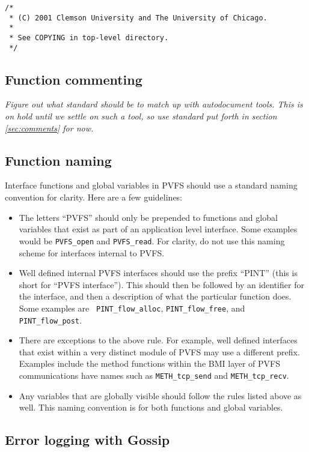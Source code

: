 \documentclass[11pt, letterpaper]{article}
\begin{document}
\begin{verbatim}
/*
 * (C) 2001 Clemson University and The University of Chicago.
 *
 * See COPYING in top-level directory.
 */       
\end{verbatim}

\subsection{Function commenting}
\label{sec:pvfs-comments}

\emph{Figure out what standard should be to match up with autodocument
tools.  This is on hold until we settle on such a tool, so use standard
put forth in section \ref{sec:comments} for now.}

\subsection{Function naming}
\label{sec:pvfs-naming}

Interface functions and global variables in PVFS should use a standard
naming convention for clarity.  Here are a few guidelines:

\begin{itemize}
\item The letters ``PVFS'' should only be prepended to functions and
global variables that exist as part of an application level interface.
Some examples would be {\tt PVFS\_open} and {\tt PVFS\_read}.  For
clarity, do not use this naming scheme for interfaces internal to PVFS.
\item Well defined internal PVFS interfaces should use the prefix
``PINT'' (this is short for ``PVFS interface'').  This should then be
followed by an identifier for the interface, and then a description of
what the particular function does.  Some examples are {\tt
PINT\_flow\_alloc}, {\tt PINT\_flow\_free}, and {\tt PINT\_flow\_post}.
\item There are exceptions to the above rule.  For example, well defined
interfaces that exist within a very distinct module of PVFS may use a
different prefix.  Examples include the method functions within the BMI
layer of PVFS communications have names such as {\tt METH\_tcp\_send}
and {\tt METH\_tcp\_recv}.
\item Any variables that are globally visible should follow the rules
listed above as well.  This naming convention is for both functions and
global variables.
\end{itemize}

\subsection{Error logging with Gossip}
\end{document}
